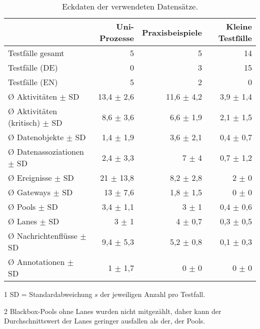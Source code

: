 \begin{table}[htbp]
    \centering
    \begin{threeparttable}
    \caption{Eckdaten der verwendeten Datensätze.}
    \label{tab:datensaetze-eckdaten}
    \begin{tabular}{l r r r}
        \toprule
        & Uni-Prozesse & Praxisbeispiele & Kleine Testfälle \\
        \midrule
        Testfälle gesamt                  & 5  & 5 & 14 \\
        Testfälle (DE)                    & 0 & 3 & 15 \\
        Testfälle (EN)                    & 5 & 2 & 0 \\
        Ø Aktivitäten $\pm$ SD\tnote{1}   & 13,4 $\pm$ 2,6 & 11,6 $\pm$ 4,2 & 3,9 $\pm$ 1,4 \\
        Ø Aktivitäten (kritisch) $\pm$ SD & 8,6 $\pm$ 3,6 & 6,6 $\pm$ 1,9 & 2,1 $\pm$ 1,5 \\
        Ø Datenobjekte $\pm$ SD           & 1,4 $\pm$ 1,9 & 3,6 $\pm$ 2,1 & 0,4 $\pm$ 0,7 \\
        Ø Datenassoziationen $\pm$ SD     & 2,4 $\pm$ 3,3 & 7 $\pm$ 4 & 0,7 $\pm$ 1,2 \\
        Ø Ereignisse $\pm$ SD             & 21 $\pm$ 13,8 & 8,2 $\pm$ 2,8 & 2 $\pm$ 0 \\
        Ø Gateways $\pm$ SD               & 13 $\pm$ 7,6 & 1,8 $\pm$ 1,5 & 0 $\pm$ 0 \\
        Ø Pools $\pm$ SD                  & 3,4 $\pm$ 1,1 & 3 $\pm$ 1 & 0,4 $\pm$ 0,6 \\
        Ø Lanes $\pm$ SD\tnote{2}         & 3 $\pm$ 1 & 4 $\pm$ 0,7 & 0,3 $\pm$ 0,5 \\
        Ø Nachrichtenflüsse $\pm$ SD      & 9,4 $\pm$ 5,3 & 5,2 $\pm$ 0,8 & 0,1 $\pm$ 0,3 \\
        Ø Annotationen $\pm$ SD           & 1 $\pm$ 1,7 & 0 $\pm$ 0 & 0 $\pm$ 0 \\
        \bottomrule
    \end{tabular}
    \begin{tablenotes}
        \item[1] SD = Standardabweichung $s$ der jeweiligen Anzahl pro Testfall.
        \item[2] Blackbox-Pools ohne Lanes wurden nicht mitgezählt, daher kann der Durchschnittswert der Lanes geringer ausfallen als der, der Pools.
    \end{tablenotes}
    \end{threeparttable}
\end{table}